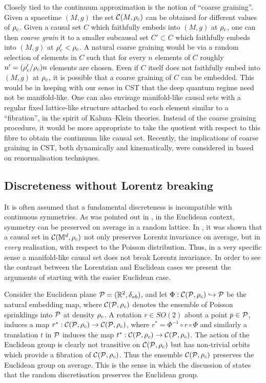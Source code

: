 Closely tied to the continuum approximation  is  the notion of ``coarse graining''. Given a spacetime $(M,g)$ the
set $\mathcal C(M,\rho_c)$ can be obtained for different values of $\rho_c$.  Given a causal set $C$ which faithfully embeds into $(M,g)$ at $\rho_c$, 
one can then \emph{coarse grain} it to a smaller subcausal set  $C' \subset C$  which faithfully embeds into $(M,g)$  at
$\rho_c' <\rho_c$.   A natural coarse graining would be via a random selection of elements in $C$ such that for every $n$ elements
of $C$ roughly $n'=(\rho_c'/\rho_c) n$ elements are chosen. Even if $C$ itself does not faithfully embed into $(M,g)$ at $\rho_c$, it is
possible that a coarse graining of $C$ can be   embedded. This would be in keeping with our sense in CST that the deep
quantum regime need not be manifold-like.   One
can also envisage manifold-like causal sets with   a regular  fixed lattice-like structure  attached to each element similar to a 
``fibration'',  in the spirit of Kaluza--Klein theories. Instead of the coarse graining procedure, it would be more
appropriate to  take the  quotient with respect to this fibre to obtain the continuum like causal
set. Recently, the implications of coarse graining in CST, both
dynamically  and
kinematically, were considered in \cite{astridcg}  based on renormalisation techniques. 

\subsection{Discreteness without Lorentz breaking} 


It is often assumed that a fundamental discreteness is incompatible with continuous symmetries.  As was pointed
out  in \cite{tdlee},  in the Euclidean context, symmetry can be preserved on average in a random lattice.
In \cite{bomhensor}, it was shown that a causal set in $\mathcal C(\mathbb M^d,\rho_c)$ not only preserves Lorentz invariance on
average, but in \emph{every} realisation, with respect to the Poisson distribution.  Thus,  in a very specific sense a manifold-like   causal set does not break Lorentz invariance.  In
order to see the contrast between the Lorentzian and Euclidean cases we present the arguments of \cite{bomhensor}
starting with the easier  Euclidean case.

Consider the Euclidean plane $\mathcal P = (\mathbb R^2,\delta_{ab})$, and let   $\Phi: \mathcal C(\mathcal P,\rho_c) \hookrightarrow \mathcal P$ be the
natural  embedding map, where $\mathcal C(\mathcal P,\rho_c)$ denotes the ensemble of Poisson sprinklings into $\mathcal P$ at density $\rho_c$. A rotation $r \in SO(2)$ about a point $p \in \mathcal P$, induces a map
$r^* : \mathcal C(\mathcal P,\rho_c) \rightarrow \mathcal C(\mathcal P,\rho_c)$, where $r^*=\Phi^{-1}\circ r \circ \Phi$ and similarly a 
translation $t$ in $\mathcal P$ induces the map $t^*: \mathcal C(\mathcal P,\rho_c)
\rightarrow \mathcal C(\mathcal P,\rho_c)$. The action of the  Euclidean group  is clearly not transitive on $\mathcal C(\mathcal P,\rho_c)$ but has non-trivial orbits which provide a fibration of $\mathcal C(\mathcal P,\rho_c)$. Thus 
the ensemble $\mathcal C(\mathcal P,\rho_c)$ preserves the Euclidean group on average. This is
the sense in which the discussion of \cite{tdlee} states that the random discretisation preserves the Euclidean group.


